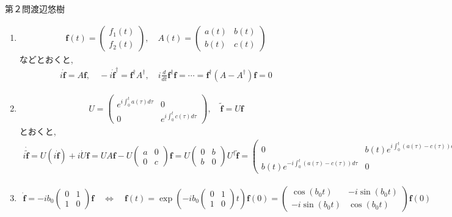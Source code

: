 \begin{answer}{第２問}{渡辺悠樹}
\begin{enumerate}
\item
  \begin{align*}
    \bm{f}(t) = \begin{pmatrix} f_1(t) \\ f_2(t) \end{pmatrix},\quad
    A(t) = \begin{pmatrix} a(t) & b(t) \\  b(t) & c(t) \end{pmatrix}
  \end{align*}
  などとおくと,
  \begin{align*}
    i\dot{\bm{f}} = A\bm{f},\quad
    -i\dot{\bm{f}}^\dag = \bm{f}^\dag A^\dag,\quad
    i\frac{d}{dt} \bm{f}^\dag \bm{f} = \cdots = \bm{f}^\dag (A-A^\dag)\bm{f} = 0
  \end{align*}

\item
  \begin{align*}
    U = \begin{pmatrix}
      e^{i\int_0^ta(\tau)d\tau} & 0 \\
      0 & e^{i\int_0^t c(\tau)d\tau}
    \end{pmatrix}, \quad \tilde{\bm{f}}=U\bm{f}
  \end{align*}
  とおくと,
  \begin{align*}
    i\dot{\tilde{\bm{f}}}
    = U(i\dot{\bm{f}}) + i\dot{U}\bm{f}
    = UA\bm{f} - U\begin{pmatrix} a & 0 \\ 0 & c\end{pmatrix} \bm{f}
    = U \begin{pmatrix} 0 & b \\ b & 0 \end{pmatrix} U^\dag \tilde{\bm{f}}
    = \begin{pmatrix}
      0 & b(t)e^{i\int_0^t(a(\tau)-c(\tau))d\tau} \\
      b(t)e^{-i\int_0^t(a(\tau)-c(\tau))d\tau} & 0
    \end{pmatrix} \tilde{\bm{f}}
  \end{align*}

\item
  \begin{align*}
    \dot{\bm{f}} = -ib_0 \begin{pmatrix} 0 & 1 \\ 1 & 0 \end{pmatrix} \bm{f}
    \quad\Leftrightarrow\quad \bm{f}(t) = \exp\left(-ib_0 \begin{pmatrix} 0 & 1 \\ 1 & 0 \end{pmatrix} t \right) \bm{f}(0)
    = \begin{pmatrix} \cos(b_0t) & -i\sin(b_0t) \\ -i\sin(b_0t) & \cos(b_0t) \end{pmatrix} \bm{f}(0)
  \end{align*}


\end{enumerate}
\end{answer}
